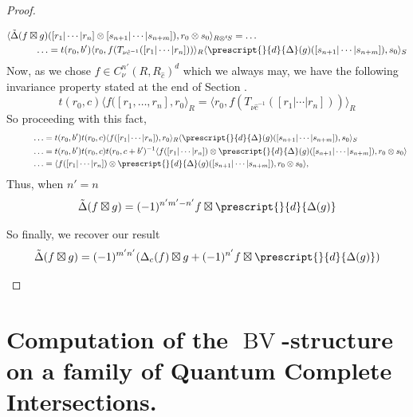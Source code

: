 \documentclass{article}
\newcommand{\ten}{\otimes}
\newcommand{\twisten}{\otimes^t\hspace{-1pt}}
\newcommand{\bv}{\operatorname{BV}}
\newcommand{\elr}{[r_1 | \cdots | r_n]}
\newcommand{\els}{[s_{n+1} | \cdots |s_{n+m}]}
\theoremstyle{plain}
\theoremstyle{definition}
\begin{document}
\begin{proof}
\begin{pfparts}
\begin{itemize}
$$\begin{aligned} &\langle \tilde{\Delta}(f \boxtimes g)(\elr \ten \els),r_0 \otimes s_0 \rangle_{R \twisten S}=  \ldots \\
&\hspace{30pt}\ldots = t(r_0,b')\langle  r_0, f(T_{\nu \hat{c}^{-1}}(\elr))  \rangle_R \langle \prescript{}{d}{\Delta}(g)(\els), s_0 \rangle_S \end{aligned}$$
Now, as we chose $f \in C^{n'}_\nu(R, R_{\hat{c}})^d$ which we always may, we have the following invariance property stated at the end of Section \label{NakayamaCochains}.
$$t(r_0,c)\langle f([r_1, \ldots, r_n], r_0 \rangle_R = \langle  r_0, f(T_{\nu \hat{c}^{-1}}(\elr))  \rangle_R$$
So proceeding with this fact,
$$\begin{aligned}
&\hspace{30pt}\ldots = t(r_0,b')t(r_0,c)\langle  f(\elr), r_0 \rangle_R \langle \prescript{}{d}{\Delta}(g)(\els), s_0 \rangle_S \\
&\hspace{30pt}\ldots = t(r_0,b')t(r_0,c)t(r_0, c+b')^{-1}\langle   f(\elr) \otimes \prescript{}{d}{\Delta}(g)(\els), r_0 \otimes s_0 \rangle \\
&\hspace{30pt}\ldots=  \langle   f(\elr) \otimes \prescript{}{d}{\Delta}(g)(\els), r_0 \otimes s_0 \rangle, \end{aligned}$$
Thus, when $n'=n$
$$\tilde{\Delta}(f\boxtimes g) = (-1)^{ n'm'-n'} f \boxtimes \prescript{}{d}{\Delta(g)}$$
 \end{itemize}
 So finally, we recover our result
 $$\tilde{\Delta}(f\boxtimes g) =  (-1)^{m'n'}(\Delta_c(f) \boxtimes g +(-1)^{n'} f \boxtimes \prescript{}{d}{\Delta(g)})$$
\end{pfparts}
\end{proof}
\section{Computation of the $\bv$-structure on a family of Quantum Complete Intersections.}
\end{document}
